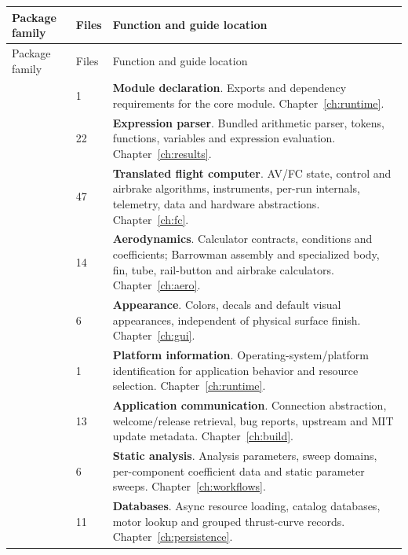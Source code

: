 \begin{longtable}{@{}L{4.6cm}L{0.8cm}L{10.2cm}@{}}\toprule Package family & Files & Function and guide location\\\midrule\endfirsthead

\toprule Package family & Files & Function and guide location\\\midrule\endhead

 & 1 & \textbf{Module declaration}. Exports and dependency requirements for the core module. Chapter~\ref{ch:runtime}.\\

 & 22 & \textbf{Expression parser}. Bundled arithmetic parser, tokens, functions, variables and expression evaluation. Chapter~\ref{ch:results}.\\

 & 47 & \textbf{Translated flight computer}. AV/FC state, control and airbrake algorithms, instruments, per-run internals, telemetry, data and hardware abstractions. Chapter~\ref{ch:fc}.\\

 & 14 & \textbf{Aerodynamics}. Calculator contracts, conditions and coefficients; Barrowman assembly and specialized body, fin, tube, rail-button and airbrake calculators. Chapter~\ref{ch:aero}.\\

 & 6 & \textbf{Appearance}. Colors, decals and default visual appearances, independent of physical surface finish. Chapter~\ref{ch:gui}.\\

 & 1 & \textbf{Platform information}. Operating-system/platform identification for application behavior and resource selection. Chapter~\ref{ch:runtime}.\\

 & 13 & \textbf{Application communication}. Connection abstraction, welcome/release retrieval, bug reports, upstream and MIT update metadata. Chapter~\ref{ch:build}.\\

 & 6 & \textbf{Static analysis}. Analysis parameters, sweep domains, per-component coefficient data and static parameter sweeps. Chapter~\ref{ch:workflows}.\\

 & 11 & \textbf{Databases}. Async resource loading, catalog databases, motor lookup and grouped thrust-curve records. Chapter~\ref{ch:persistence}.\\


\end{longtable}

